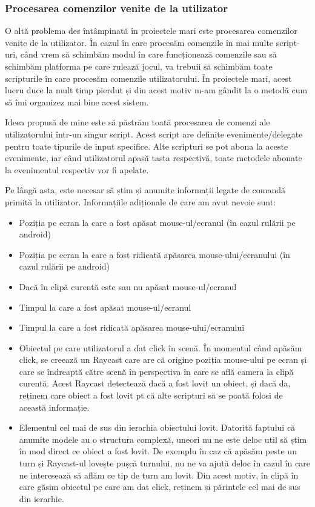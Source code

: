 \documentclass[12pt, a4paper]{article}
\begin{document}
	
	
	
	
	\subsubsection{Procesarea comenzilor venite de la utilizator}
	
	O altă problema des întâmpinată în proiectele mari este procesarea comenzilor venite de la utilizator. În cazul în care procesăm comenzile în mai multe script-uri, când vrem să schimbăm modul în care funcționează comenzile sau să schimbăm platforma pe care rulează jocul, va trebuii să schimbăm toate scripturile în care procesăm comenzile utilizatorului. În proiectele mari, acest lucru duce la mult timp pierdut și din acest motiv m-am gândit la o metodă cum să îmi organizez mai bine acest sistem.
	\newline
	
	Ideea propusă de mine este să păstrăm toată procesarea de comenzi ale utilizatorului într-un singur script. Acest script are definite evenimente/delegate pentru toate tipurile de input specifice. Alte scripturi se pot abona la aceste evenimente, iar când utilizatorul apasă tasta respectivă, toate metodele abonate la evenimentul respectiv vor fi apelate.
	\newline
	
	Pe lângă asta, este necesar să știm și anumite informații legate de comandă primită la utilizator. Informațiile adiționale de care am avut nevoie sunt:
	
	\begin{itemize}
		\item Poziția pe ecran la care a fost apăsat mouse-ul/ecranul (în cazul rulării pe android)
		\item Poziția pe ecran la care a fost ridicată apăsarea mouse-ului/ecranului (în cazul rulării pe android)
		\item Dacă în clipă curentă este sau nu apăsat mouse-ul/ecranul
		\item Timpul la care a fost apăsat mouse-ul/ecranul
		\item Timpul la care a fost ridicată apăsarea mouse-ului/ecranului
		\item Obiectul pe care utilizatorul a dat click în scenă. În momentul când apăsăm click, se creează un Raycast care are că origine poziția mouse-ului pe ecran și care se îndreaptă către scenă în perspectiva în care se află camera la clipă curentă. Acest Raycast detectează dacă a fost lovit un obiect, și dacă da, reținem care obiect a fost lovit pt că alte scripturi să se poată folosi de această informație.
		\item Elementul cel mai de sus din ierarhia obiectului lovit. Datorită faptului că anumite modele au o structura complexă, uneori nu ne este deloc util să știm în mod direct ce obiect a fost lovit. De exemplu în caz că apăsăm peste un turn și Raycast-ul lovește pușcă turnului, nu ne va ajută deloc în cazul în care ne interesează să aflăm ce tip de turn am lovit. Din acest motiv, în clipă în care găsim obiectul pe care am dat click, reținem și părintele cel mai de sus din ierarhie.
	\end{itemize}
	
\end{document}
